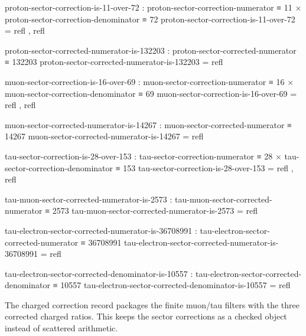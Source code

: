 \documentclass[11pt]{article}
\begin{document}
\begin{code}
proton-sector-correction-is-11-over-72 :
  proton-sector-correction-numerator ≡ 11 ×
  proton-sector-correction-denominator ≡ 72
proton-sector-correction-is-11-over-72 = refl , refl

proton-sector-corrected-numerator-is-132203 :
  proton-sector-corrected-numerator ≡ 132203
proton-sector-corrected-numerator-is-132203 = refl

muon-sector-correction-is-16-over-69 :
  muon-sector-correction-numerator ≡ 16 ×
  muon-sector-correction-denominator ≡ 69
muon-sector-correction-is-16-over-69 = refl , refl

muon-sector-corrected-numerator-is-14267 :
  muon-sector-corrected-numerator ≡ 14267
muon-sector-corrected-numerator-is-14267 = refl

tau-sector-correction-is-28-over-153 :
  tau-sector-correction-numerator ≡ 28 ×
  tau-sector-correction-denominator ≡ 153
tau-sector-correction-is-28-over-153 = refl , refl

tau-muon-sector-corrected-numerator-is-2573 :
  tau-muon-sector-corrected-numerator ≡ 2573
tau-muon-sector-corrected-numerator-is-2573 = refl

tau-electron-sector-corrected-numerator-is-36708991 :
  tau-electron-sector-corrected-numerator ≡ 36708991
tau-electron-sector-corrected-numerator-is-36708991 = refl

tau-electron-sector-corrected-denominator-is-10557 :
  tau-electron-sector-corrected-denominator ≡ 10557
tau-electron-sector-corrected-denominator-is-10557 = refl
\end{code}

The charged correction record packages the finite muon/tau filters with the
three corrected charged ratios.  This keeps the sector corrections as a
checked object instead of scattered arithmetic.
\end{document}
